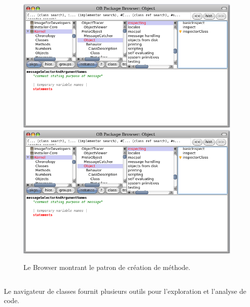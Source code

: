 \documentclass[a4paper,10pt,twoside]{book}
\begin{document}
\begin{figure}[htbp]
   \centering
   \ifluluelse
	   {\includegraphics [width=\textwidth]{SystemBrowserMethodTemplate}}
	   {\includegraphics[width=.7\textwidth]{SystemBrowserMethodTemplate}}
   \caption{Le Browser montrant le patron de cr\'eation de m\'ethode.
   }
\end{figure}

\subsection{} %

Le navigateur de classes fournit plusieurs outils pour l'exploration et 
l'analyse de code. 

\subsubsection{}
\end{document}
